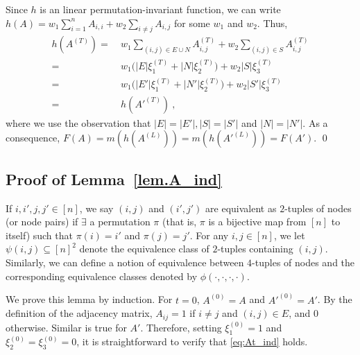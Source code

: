 \documentclass{article}
\begin{document}
Since $h$ is an linear permutation-invariant function, we can write $h(A) = w_1 \sum_{i=1}^n A_{i,i} + w_2 \sum_{i \neq j} A_{i,j}$ for some $w_1$ and $w_2$. Thus, 
\begin{align*}
    h(A^{(T)}) =&~ w_1 \sum_{(i, j) \in E \cup N} A^{(T)}_{i, j} + w_2 \sum_{(i, j) \in S} A^{(T)}_{i, j} \\
    =&~ w_1 \big ( |E| \xi_1^{(T)} + |N| \xi_2^{(T)} \big ) + w_2 |S| \xi_3^{(T)} \\
    =&~ w_1 \big ( |E'| \xi_1^{(T)} + |N'| \xi_2^{(T)} \big ) + w_2 |S'| \xi_3^{(T)} \\
    =&~ h(A'^{(T)})~,
\end{align*}
where we use the observation that $|E| = |E'|, |S| = |S'|$ and $|N| = |N'|$. As a consequence, $F(A) = m(h(A^{(L)})) = m(h(A'^{(L)})) = F(A')$.  \qed

\subsection{Proof of Lemma~\ref{lem.A_ind}}
\label{app:pf_lem_A_ind}
If $i, i', j, j' \in [n]$, we say $(i, j)$ and $(i', j')$ are equivalent as $2$-tuples of nodes (or node pairs) if $\exists$ a permutation $\pi$ (that is, $\pi$ is a bijective map from $[n]$ to itself) such that $\pi(i) = i'$ and $\pi(j) = j'$. For any $i, j \in [n]$, we let $\psi(i, j) \subseteq [n]^2$ denote the equivalence class of $2$-tuples containing $(i, j)$. Similarly, we can define a notion of equivalence between $4$-tuples of nodes and the corresponding equivalence classes denoted by $\phi(\cdot, \cdot, \cdot, \cdot)$.

We prove this lemma by induction. For $t=0$, $A^{(0)} = A$ and $A'^{(0)} = A'$. By the definition of the adjacency matrix, $A_{ij} = 1$ if $i \neq j$ and $(i, j) \in E$, and $0$ otherwise. Similar is true for $A'$. Therefore, setting $\xi_1^{(0)} = 1$ and $\xi_2^{(0)} = \xi_3^{(0)} = 0$, it is straightforward to verify that \eqref{eq:At_ind} holds.
\end{document}
